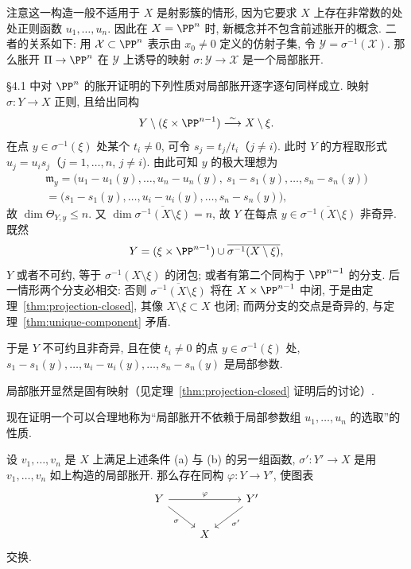注意这一构造一般不适用于 $X$ 是射影簇的情形, 因为它要求 $X$ 上存在非常数的处处正则函数 $u_1, \ldots, u_n$. 因此在 $X = \PP^n$ 时, 新概念并不包含前述胀开的概念. 二者的关系如下: 用 $\mathcal X \subset \PP^n$ 表示由 $x_0 \ne 0$ 定义的仿射子集, 令 $\mathcal Y = \sigma^{-1}(\mathcal X)$. 那么胀开 $\Pi \to \PP^n$ 在 $\mathcal Y$ 上诱导的映射 $\sigma: \mathcal Y \to \mathcal X$ 是一个局部胀开.

§4.1 中对 $\PP^n$ 的胀开证明的下列性质对局部胀开逐字逐句同样成立. 映射 $\sigma: Y \to X$ 正则, 且给出同构
\[
	Y \setminus (\xi \times \PP^{n-1}) \overset{\sim}{\longrightarrow} X \setminus \xi.
\]
在点 $y \in \sigma^{-1}(\xi)$ 处某个 $t_i \ne 0$, 可令 $s_j = t_j/t_i$（$j \ne i$). 此时 $Y$ 的方程取形式 $u_j = u_i s_j$（$j = 1, \ldots, n$, $j \ne i$). 由此可知 $y$ 的极大理想为
\begin{gather*}
	\mathfrak m_y = \bigl( u_1 - u_1(y), \ldots, u_n - u_n(y),\ s_1 - s_1(y), \ldots, s_n - s_n(y) \bigr) \\
	= \bigl( s_1 - s_1(y), \ldots, u_i - u_i(y), \ldots, s_n - s_n(y) \bigr),
\end{gather*}
故 $\dim \Theta_{Y,y} \le n$. 又 $\dim \overline{\sigma^{-1}(X \setminus \xi)} = n$, 故 $Y$ 在每点 $y \in \overline{\sigma^{-1}(X \setminus \xi)}$ 非奇异. 既然
\[
	Y = (\xi \times \PP^{n-1}) \cup \overline{\sigma^{-1}(X \setminus \xi)},
\]
$Y$ 或者不可约, 等于 $\sigma^{-1}(X \setminus \xi)$ 的闭包; 或者有第二个同构于 $\PP^{n-1}$ 的分支. 后一情形两个分支必相交: 否则 $\overline{\sigma^{-1}(X \setminus \xi)}$ 将在 $X \times \PP^{n-1}$ 中闭, 于是由定理~\ref{thm:projection-closed}, 其像 $X \setminus \xi \subset X$ 也闭; 而两分支的交点是奇异的, 与定理~\ref{thm:unique-component} 矛盾.

于是 $Y$ 不可约且非奇异, 且在使 $t_i \ne 0$ 的点 $y \in \sigma^{-1}(\xi)$ 处, $s_1 - s_1(y), \ldots, u_i - u_i(y), \ldots, s_n - s_n(y)$ 是局部参数.

局部胀开显然是固有映射（见定理~\ref{thm:projection-closed} 证明后的讨论）.

现在证明一个可以合理地称为``局部胀开不依赖于局部参数组 $u_1, \ldots, u_n$ 的选取''的性质.

\begin{lemma}\label{lem:blowup-independence}
	设 $v_1, \ldots, v_n$ 是 $X$ 上满足上述条件 (a) 与 (b) 的另一组函数, $\sigma': Y' \to X$ 是用 $v_1, \ldots, v_n$ 如上构造的局部胀开. 那么存在同构 $\varphi: Y \to Y'$, 使图表
	\[
		\begin{tikzcd}
			Y \ar[rr, "\varphi"] \ar[dr, swap, "\sigma"] & & Y' \ar[dl, "\sigma'"] \\
			& X &
		\end{tikzcd}
	\]
	交换.
\end{lemma}

